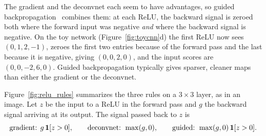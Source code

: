 The gradient and the deconvnet each seem to have advantages, so guided backpropagation~\citep{springenberg2015} combines them: at each ReLU, the backward signal is zeroed both where the forward input was negative \emph{and} where the backward signal is negative. On the toy network (Figure~\ref{fig:toycnn}d) the first ReLU now sees $(0,1,2,-1)$, zeroes the first two entries because of the forward pass and the last because it is negative, giving $(0,0,2,0)$, and the input scores are $(0,0,-2,6,0)$. Guided backpropagation typically gives sparser, cleaner maps than either the gradient or the deconvnet.

Figure~\ref{fig:relu_rules} summarizes the three rules on a $3\times 3$ layer, as in an image. Let $z$ be the input to a ReLU in the forward pass and $g$ the backward signal arriving at its output. The signal passed back to $z$ is
\begin{equation}
  \text{gradient: } g\,\mathbf{1}[z>0], \qquad \text{deconvnet: } \max(g,0), \qquad \text{guided: } \max(g,0)\,\mathbf{1}[z>0].
  \label{eq:relu_rules}
\end{equation}

